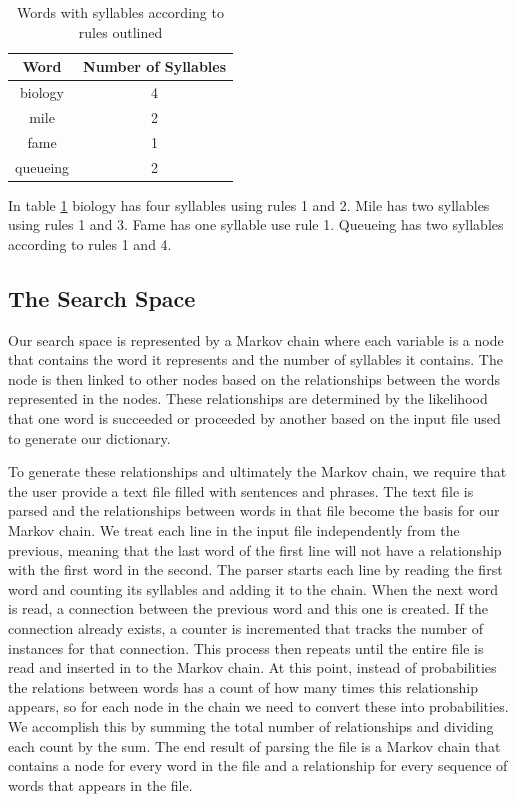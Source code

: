 \documentclass[]{article}
\begin{document}
\begin{table}[H]
\begin{center}
	\begin{tabular}{| c | c |}
		\hline
		Word & Number of Syllables \\
		\hline
		biology & 4 \\
		\hline
		mile & 2 \\
		\hline
		fame & 1 \\
		\hline
		queueing & 2 \\
		\hline
	\end{tabular}
\caption{Words with syllables according to rules outlined}
\label{table:syllables}
\end{center}
\end{table}

In table \ref{table:syllables} biology has four syllables using rules 1 and 2. Mile has two syllables using rules 1 and 3. Fame has one syllable use rule 1. Queueing has two syllables according to rules 1 and 4.
\subsection{The Search Space}
Our search space is represented by a Markov chain where each variable is a node that contains the word it represents and the number of syllables it contains. The node is then linked to other nodes based on the relationships between the words represented in the nodes. These relationships are determined by the likelihood that one word is succeeded or proceeded by another based on the input file used to generate our dictionary.

To generate these relationships and ultimately the Markov chain, we require that the user provide a text file filled with sentences and phrases. The text file is parsed and the relationships between words in that file become the basis for our Markov chain. We treat each line in the input file independently from the previous, meaning that the last word of the first line will not have a relationship with the first word in the second. The parser starts each line by reading the first word and counting its syllables and adding it to the chain. When the next word is read, a connection between the previous word and this one is created. If the connection already exists, a counter is incremented that tracks the number of instances for that connection. This process then repeats until the entire file is read and inserted in to the Markov chain. At this point, instead of probabilities the relations between words has a count of how many times this relationship appears, so for each node in the chain we need to convert these into probabilities. We accomplish this by summing the total number of relationships and dividing each count by the sum. The end result of parsing the file is a Markov chain that contains a node for every word in the file and a relationship for every sequence of words that appears in the file.
\end{document}
